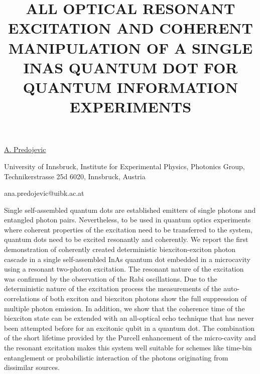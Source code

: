\title{ALL OPTICAL RESONANT EXCITATION AND COHERENT MANIPULATION OF A SINGLE INAS QUANTUM DOT FOR QUANTUM INFORMATION EXPERIMENTS}

\underline{A. Predojevic}

{\normalsize{\vspace{-4mm}
University of Innsbruck,
Institute for Experimental Physics,
Photonics Group,
Technikerstrasse 25d
6020, Innsbruck,
Austria

\email ana.predojevic@uibk.ac.at}}

Single self-assembled quantum dots are established emitters of single photons and entangled photon pairs. Nevertheless, to be used in quantum optics experiments where coherent properties of the excitation need to be transferred to the system, quantum dots need to be excited resonantly and coherently.
We report the first demonstration of coherently created deterministic biexciton-exciton photon cascade in a single self-assembled InAs quantum dot embedded in a microcavity using a resonant two-photon excitation. The resonant nature of the excitation was confirmed by the observation of the Rabi oscillations. Due to the deterministic nature of the excitation process the measurements of the auto-correlations of both exciton and biexciton photons show the full suppression of multiple photon emission. In addition, we show that the coherence time of the biexciton state can be extended with an all-optical echo technique that has never been attempted before for an excitonic qubit in a quantum dot.
The combination of the short lifetime provided by the Purcell enhancement of the micro-cavity and the resonant excitation makes this system well suitable for schemes like time-bin entanglement or probabilistic interaction of the photons originating from dissimilar sources.

\vspace{\baselineskip} 
